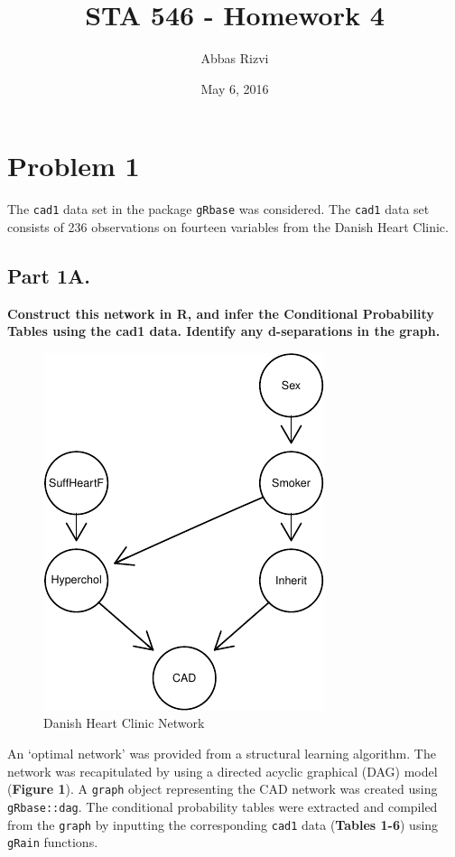 \documentclass[]{article}
\title{STA 546 - Homework 4}
\author{Abbas Rizvi}
\date{May 6, 2016}
\begin{document}
\maketitle


\section{Problem 1}\label{problem-1}

The \texttt{cad1} data set in the package \texttt{gRbase} was
considered. The \texttt{cad1} data set consists of 236 observations on
fourteen variables from the Danish Heart Clinic.

\subsection{Part 1A.}\label{part-1a.}

\textbf{Construct this network in R, and infer the Conditional
Probability Tables using the cad1 data. Identify any d-separations in
the graph.}

\begin{figure}[h]

{\centering \includegraphics{stat546_hw4_files/figure-latex/unnamed-chunk-1-1} 

}

\caption{Danish Heart Clinic Network}\label{fig:unnamed-chunk-1}
\end{figure}

An `optimal network' was provided from a structural learning algorithm.
The network was recapitulated by using a directed acyclic graphical
(DAG) model (\textbf{Figure 1}). A \texttt{graph} object representing
the CAD network was created using \texttt{gRbase::dag}. The conditional
probability tables were extracted and compiled from the \texttt{graph}
by inputting the corresponding \texttt{cad1} data (\textbf{Tables 1-6})
using \texttt{gRain} functions.
\end{document}

